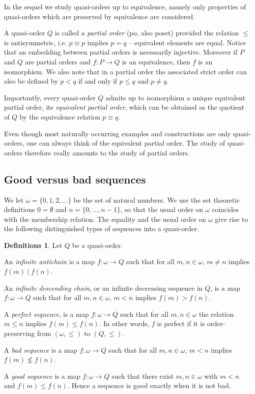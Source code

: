 \documentclass{article}%
\theoremstyle{plain}
\theoremstyle{definition}
\newtheorem{definition}[theorem]{Definition}
\newtheorem{definition}[theorem]{Notation}
\newtheorem{definition}[theorem]{Notations}
\newtheorem{definition}[theorem]{Definitions}
\theoremstyle{remark}
\newcommand{\incomp}{\mathbin{|}}
\begin{document}
In the sequel we study quasi-orders up to equivalence, namely only properties of quasi-orders which are preserved by equivalence are considered.

A quasi-order $Q$ is called a \emph{partial order} (po, also poset) provided the relation $\leq$ is antisymmetric, i.e. $p\equiv p$ implies $p=q$ -- equivalent elements are equal. Notice that an embedding between partial orders is necessarily injective. Moreover if $P$ and $Q$ are partial orders and $f:P\to Q$ is an equivalence, then $f$ is an isomorphism. We also note that in a partial order the associated strict order can also be defined by $p<q$ if and only if $p\leq q$ and $p\neq q$. 

Importantly, every quasi-order $Q$ admits up to isomorphism a unique equivalent partial order, its \emph{equivalent partial order}, which can be obtained as the quotient of $Q$ by the equivalence relation $p\equiv q$.

Even though most naturally occurring examples and constructions are only quasi-orders, one can always think of the equivalent partial order. The study of quasi-orders therefore really amounts to the study of partial orders.


\subsection{Good versus bad sequences}


We let $\omega=\{0,1,2,\ldots\}$ be the set of natural numbers. We use the set theoretic definitions $0=\emptyset$ and $n=\{0,\ldots,n-1\}$, so that the usual order on $\omega$ coincides with the membership relation. The equality and the usual order on $\omega$ give rise to the following distinguished types of sequences into a quasi-order.

\begin{definition}Let $Q$ be a quasi-order.
\begin{enumDefn}
\item An \emph{infinite antichain} is a map $f:\omega \to Q$ such that for all $m,n\in\omega$, $m\neq n$ implies $f(m)\incomp f(n)$.
\item An \emph{infinite descending chain}, or an infinite decreasing sequence in $Q$, is a map $f:\omega \to Q$ such that for all $m,n\in\omega$, $m<n$ implies $f(m)>f(n)$.
\item A \emph{perfect sequence}, is a map $f:\omega\to Q$ such that for all $m, n\in\omega$ the relation $m\leq n$ implies $f(m)\leq f(n)$. In other words, $f$ is perfect if it is order-preserving from $(\omega,\leq)$ to $(Q,\leq)$.
\item A \emph{bad sequence} is a map $f:\omega\to Q$ such that for all $m, n\in\omega$, $m<n$ implies $f(m)\nleq f(n)$.
\item A \emph{good sequence} is a map $f:\omega\to Q$ such that there exist $m,n\in\omega$ with $m<n$ and $f(m)\leq f(n)$. Hence a sequence is good exactly when it is not bad. 
\end{enumDefn}
\end{definition}
\end{document}

